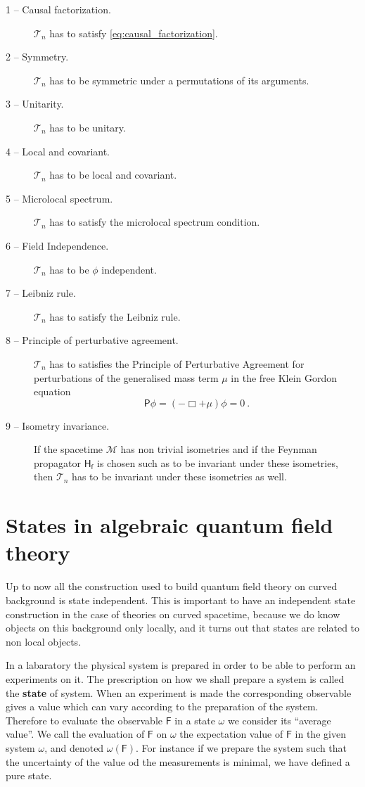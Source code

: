 \documentclass[11pt]{book}
\newcommand{\Mcal}{\mathcal{M}}
\newcommand{\Tcal}{\mathcal{T}}
\newcommand{\Fsf}{\mathsf{F}}
\newcommand{\Hsf}{\mathsf{H}}
\newcommand{\Psf}{\mathsf{P}}
\newcommand{\fsf}{\mathsf{f}}
\theoremstyle{break}
\begin{document}
\begin{description}
%
\item[1 -- Causal factorization.] $\Tcal_n$ has to satisfy \eqref{eq:causal_factorization}.
%
\item[2 -- Symmetry.] $\Tcal_n$ has to be symmetric under a permutations of its arguments.
%
\item[3 -- Unitarity.] $\Tcal_n$ has to be unitary.
%
\item[4 -- Local and covariant.] $\Tcal_n$ has to be local and covariant.
%
\item[5 -- Microlocal spectrum.] $\Tcal_n$ has to satisfy the microlocal spectrum condition.
%
\item[6 -- Field Independence.] $\Tcal_n$ has to be $\phi$ independent.
%
\item[7 -- Leibniz rule.] $\Tcal_n$ has to satisfy the Leibniz rule.
%
\item[8 -- Principle of perturbative agreement.] $\Tcal_n$ has to satisfies the Principle of Perturbative Agreement for perturbations of the generalised mass term $\mu$ in the free Klein Gordon equation
%
\begin{equation*}
\Psf \phi = \left( - \Box + \mu \right) \phi = 0 \ . 
\end{equation*}
%
\item[9 -- Isometry invariance.] If the spacetime $\Mcal$ has non trivial isometries and if the Feynman propagator $\Hsf_\fsf$ is chosen such as to be invariant under these isometries, then $\Tcal_n$ has to be invariant under these isometries as well.
%
\end{description}


\section{States in algebraic quantum field theory}


Up to now all the construction used to build quantum field theory on curved background is state independent. This is important to have an independent state construction in the case of theories on curved spacetime, because we do know objects on this background only locally, and it turns out that states are related to non local objects.


In a labaratory the physical system is prepared in order to be able to perform an experiments on it. The prescription on how we shall prepare a system is called the \textbf{state} of system. When an experiment is made the corresponding observable gives a value which can vary according to the preparation of the system. Therefore to evaluate the observable $\Fsf$ in a state $\omega$ we consider its ``average value''. We call the evaluation of $\Fsf$ on $\omega$ the expectation value of $\Fsf$ in the given system $\omega$, and denoted $\omega(\Fsf)$. For instance if we prepare the system such that the uncertainty of the value od the measurements is minimal, we have defined a pure state.
\end{document}
